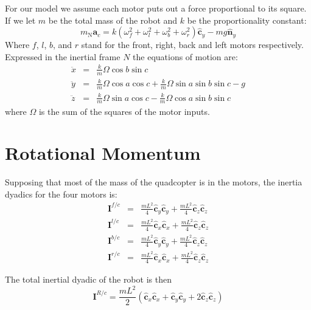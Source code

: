 \documentclass[lettersize,journal]{IEEEtran}
\begin{document}
For our model we assume each motor puts out a force proportional to its square. If we let $m$ be the total mass of the robot and $k$ be the proportionality constant:
\begin{equation}
  m{_\mathrm{N}\mathbf{a}_c} = k \left(\omega_f^2 + \omega_l^2 + \omega_b^2 + \omega_r^2\right) \mathbf{\hat{c}}_y - mg \mathbf{\hat{n}}_y
\end{equation}
Where $f$, $l$, $b$, and $r$ stand for the front, right, back and left motors respectively. Expressed in the inertial frame $N$ the equations of motion are:
\begin{eqnarray}
  \ddot{x} &=& \frac{k}{m} \Omega \cos b \sin c \\
  \ddot{y} &=& \frac{k}{m} \Omega \cos a \cos c + \frac{k}{m} \Omega \sin a \sin b \sin c - g\\
  \ddot{z} &=& \frac{k}{m} \Omega \sin a \cos c - \frac{k}{m} \Omega \cos a \sin b \sin c 
\end{eqnarray}
where $\Omega$ is the sum of the squares of the motor inputs.



\section{Rotational Momentum}
Supposing that most of the mass of the quadcopter is in the motors, the inertia dyadics for the four motors is:
\begin{eqnarray}
  \mathbf{I}^{f/c} &=& \frac{mL^2}{4} \mathbf{\hat{c}}_y\mathbf{\hat{c}}_y + \frac{mL^2}{4} \mathbf{\hat{c}}_z \mathbf{\hat{c}}_z \\
  \mathbf{I}^{l/c} &=& \frac{mL^2}{4} \mathbf{\hat{c}}_x\mathbf{\hat{c}}_x + \frac{mL^2}{4} \mathbf{\hat{c}}_z \mathbf{\hat{c}}_z \\
  \mathbf{I}^{b/c} &=& \frac{mL^2}{4} \mathbf{\hat{c}}_y\mathbf{\hat{c}}_y + \frac{mL^2}{4} \mathbf{\hat{c}}_z \mathbf{\hat{c}}_z \\
  \mathbf{I}^{r/c} &=& \frac{mL^2}{4} \mathbf{\hat{c}}_x\mathbf{\hat{c}}_x + \frac{mL^2}{4} \mathbf{\hat{c}}_z \mathbf{\hat{c}}_z
\end{eqnarray}

The total inertial dyadic of the robot is then
\begin{equation}
  \mathbf{I}^{R/c} = \frac{mL^2}{2} \left(\mathbf{\hat{c}}_x\mathbf{\hat{c}}_x + \mathbf{\hat{c}}_y\mathbf{\hat{c}}_y + 2 \mathbf{\hat{c}}_z\mathbf{\hat{c}}_z\right)
\end{equation}
\end{document}
